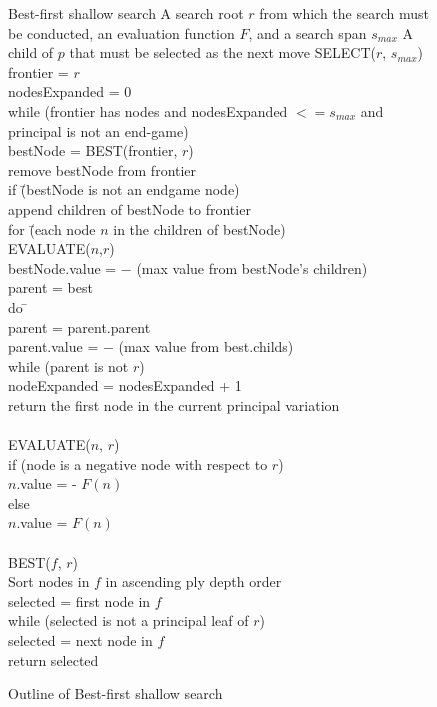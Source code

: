 \begin{figure} [!ht]
\begin{algorithm} 
{Best-first shallow search}
{A search root $r$ from which the search must be conducted, an evaluation function $F$, and a search span $s_{max}$}
{A child of $p$ that must be selected as the next move} 
SELECT($r$, $s_{max}$)  \+ \\
	frontier = $r$ \\
	nodesExpanded = 0 \\
	while (frontier has nodes and nodesExpanded $<= s_{max}$  
	       and principal is not an end-game) \+ \\
	    bestNode = BEST(frontier, $r$)  \\
	    remove bestNode from frontier \\
	    if  \=(bestNode is not an endgame node)  \+ \\
				append children of bestNode to frontier \\
	     for \= (each node $n$ in the children of bestNode) \\
	     \> EVALUATE($n$,$r$)\\
				bestNode.value = $-$ (max value from bestNode's children) \\
			parent = best \- \\
			do \= \+ \\
	    	parent = parent.parent \\
	    	parent.value = $-$ (max value from best.childs) \- \\
	    while (parent is not $r$)  \\
	    nodeExpanded = nodesExpanded + 1 \-  \\
	return the first node in the current principal variation \-\\
	\\
	EVALUATE($n$, $r$) \+\\
	if (node is a negative node with respect to $r$) \\
	\>$n$.value = - $F(n)$ \\
	else \\
	\>$n$.value = $F(n)$\\
	\-\\
	BEST($f$, $r$) \+\\
	\label{line:bfss-sort}Sort nodes in $f$ in ascending ply depth order\\ 
	selected = first node in $f$ \\
	while (selected is not a principal leaf of $r$) \\
		\> selected = next node in $f$ \\
	return selected	
\end{algorithm}
\caption{Outline of Best-first shallow search}	
\label{alg:bfss}
\end{figure}

